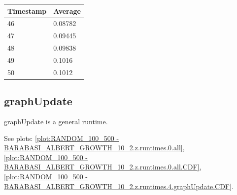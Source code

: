 \begin{tabular}{|l||l|}
\hline
	\textbf{Timestamp} & \textbf{Average} \\ \hline
	46 & 0.08782 \\ \hline
	47 & 0.09445 \\ \hline
	48 & 0.09838 \\ \hline
	49 & 0.1016 \\ \hline
	50 & 0.1012 \\ \hline
\end{tabular}

\subsection{graphUpdate}
graphUpdate is a general runtime.

See plots: \ref{plot:RANDOM_100_500 - BARABASI_ALBERT_GROWTH_10_2.z.runtimes.0.all}, \ref{plot:RANDOM_100_500 - BARABASI_ALBERT_GROWTH_10_2.z.runtimes.0.all.CDF}, \ref{plot:RANDOM_100_500 - BARABASI_ALBERT_GROWTH_10_2.z.runtimes.4.graphUpdate.CDF}.

